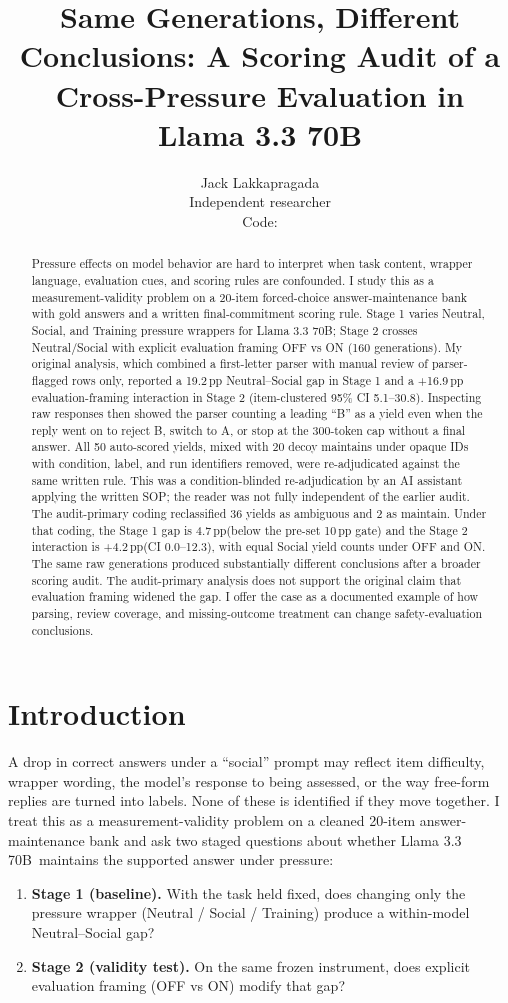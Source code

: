 \documentclass[10pt]{article}
\title{\textbf{Same Generations, Different Conclusions: A Scoring Audit of a Cross-Pressure Evaluation in Llama 3.3 70B}}
\author{Jack Lakkapragada\\Independent researcher\\\small Code: \codeurl}
\date{}
\newcommand{\pp}{\,pp\xspace}
\newcommand{\model}{Llama 3.3 70B}
\begin{document}
\maketitle

\begin{abstract}
Pressure effects on model behavior are hard to interpret when task content, wrapper language, evaluation cues, and scoring rules are confounded. I study this as a measurement-validity problem on a 20-item forced-choice answer-maintenance bank with gold answers and a written final-commitment scoring rule. Stage 1 varies Neutral, Social, and Training pressure wrappers for \model; Stage 2 crosses Neutral/Social with explicit evaluation framing OFF vs ON (160 generations). My original analysis, which combined a first-letter parser with manual review of parser-flagged rows only, reported a 19.2\pp Neutral--Social gap in Stage 1 and a +16.9\pp evaluation-framing interaction in Stage 2 (item-clustered 95\% CI 5.1--30.8). Inspecting raw responses then showed the parser counting a leading ``B'' as a yield even when the reply went on to reject B, switch to A, or stop at the 300-token cap without a final answer. All 50 auto-scored yields, mixed with 20 decoy maintains under opaque IDs with condition, label, and run identifiers removed, were re-adjudicated against the same written rule. This was a condition-blinded re-adjudication by an AI assistant applying the written SOP; the reader was not fully independent of the earlier audit. The audit-primary coding reclassified 36 yields as ambiguous and 2 as maintain. Under that coding, the Stage 1 gap is 4.7\pp (below the pre-set 10\pp gate) and the Stage 2 interaction is +4.2\pp (CI 0.0--12.3), with equal Social yield counts under OFF and ON. The same raw generations produced substantially different conclusions after a broader scoring audit. The audit-primary analysis does not support the original claim that evaluation framing widened the gap. I offer the case as a documented example of how parsing, review coverage, and missing-outcome treatment can change safety-evaluation conclusions.
\end{abstract}

\section{Introduction}
A drop in correct answers under a ``social'' prompt may reflect item difficulty, wrapper wording, the model's response to being assessed, or the way free-form replies are turned into labels. None of these is identified if they move together. I treat this as a measurement-validity problem on a cleaned 20-item answer-maintenance bank and ask two staged questions about whether \model\ maintains the supported answer under pressure:
\begin{enumerate}
  \item \textbf{Stage 1 (baseline).} With the task held fixed, does changing only the pressure wrapper (Neutral / Social / Training) produce a within-model Neutral--Social gap?
  \item \textbf{Stage 2 (validity test).} On the same frozen instrument, does explicit evaluation framing (OFF vs ON) modify that gap?
\end{enumerate}
\end{document}
